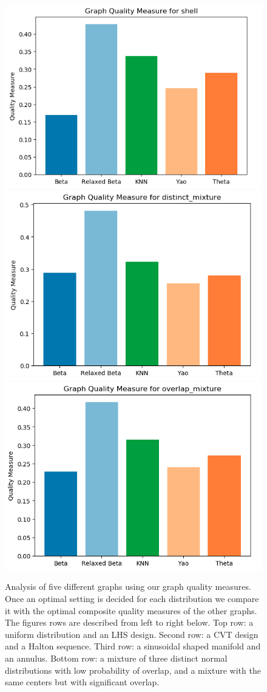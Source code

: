 \begin{figure}[htbp]
    \includegraphics[width=0.45\linewidth]{figs/chap7/shell_quality.png}
    \includegraphics[width=0.45\linewidth]{figs/chap7/distinct_quality.png}
    \includegraphics[width=0.45\linewidth]{figs/chap7/overlap_quality.png}
    \caption{Analysis of five different graphs using our graph quality measures.
    Once an optimal setting is decided for each distribution we compare it with the optimal composite quality measures of the other graphs.
    The figures rows are described from left to right below.
    Top row: a uniform distribution and an LHS design.
    Second row: a CVT design and a Halton sequence.
    Third row: a sinusoidal shaped manifold and an annulus.
    Bottom row: a mixture of three distinct normal distributions with low probability of overlap, and a mixture with the same centers but with significant overlap.}
    \label{fig:graph_quality}
\end{figure}

